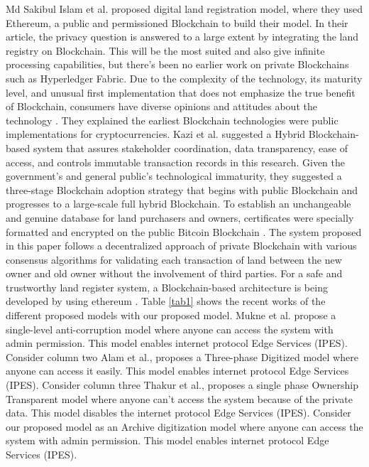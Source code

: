 \documentclass[12pt]{ucthesis}
\begin{document}
Md Sakibul Islam et al.\cite{rf1} proposed digital land registration model, where they used Ethereum, a public and permissioned Blockchain to build their model. In their article, the privacy question is answered to a large extent by integrating the land registry on Blockchain. This will be the most suited and also give infinite processing capabilities, but there's been no earlier work on private Blockchains such as Hyperledger Fabric.
Due to the complexity of the technology, its maturity level, and unusual first implementation that does not emphasize the true benefit of Blockchain, consumers have diverse opinions and attitudes about the technology \cite{rf2}. They explained the earliest Blockchain technologies were public implementations for cryptocurrencies.
Kazi et al.\cite{rf3} suggested a Hybrid Blockchain-based system that assures stakeholder coordination, data transparency, ease of access, and controls immutable transaction records in this research. Given the government's and general public's technological immaturity, they suggested a three-stage Blockchain adoption strategy that begins with public Blockchain and progresses to a large-scale full hybrid Blockchain. To establish an unchangeable and genuine database for land purchasers and owners, certificates were specially formatted and encrypted on the public Bitcoin Blockchain \cite{rf5}.
The system proposed in \cite{rf6} this paper follows a decentralized approach of private Blockchain with various consensus algorithms for validating each transaction of land between the new owner and old owner without the involvement of third parties.
For a safe and trustworthy land register system, a Blockchain-based architecture is being developed by using ethereum \cite{rf7}. 
Table \ref{tab1} shows the recent works of the different proposed models with our proposed model. Mukne et al.\cite{ref15} propose a single-level anti-corruption model where anyone can access the system with admin permission. This model enables internet protocol  Edge Services (IPES). Consider column two Alam et al.\cite{rf3}, proposes a Three-phase Digitized model where anyone can access it easily. This model enables internet protocol  Edge Services (IPES). Consider column three Thakur et al.\cite{ref11}, proposes a single phase Ownership Transparent model where anyone can't access the system because of the private data. This model disables the internet protocol  Edge Services (IPES). Consider our proposed model as an Archive digitization model where anyone can access the system with admin permission. This model enables internet protocol  Edge Services (IPES).
\end{document}

